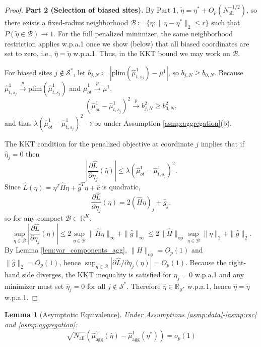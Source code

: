 \documentclass{article}
\newtheorem{lemma}[theorem]{Lemma}
\begin{document}
\begin{proof}
\textbf{Part 2 (Selection of biased sites).}
By Part 1, $\widetilde{\eta}=\eta^*+O_p(N_{\mathrm{all}}^{-1/2})$, so there exists a fixed-radius neighborhood
$\mathcal{B}\coloneqq\{\eta:\|\eta-\eta^*\|_2\le r\}$ such that $P(\widetilde{\eta}\in\mathcal{B})\to 1$.
For the full penalized minimizer, the same neighborhood restriction applies w.p.a.1 once we show (below) that all biased coordinates are set to zero, i.e., $\widehat{\eta}=\widetilde{\eta}$ w.p.a.1. Thus, in the KKT bound we may work on $\mathcal{B}$.

For biased sites $j \notin \mathcal{S}^*$, let $b_{j,N}\coloneqq |\text{plim}(\widehat{\mu}^1_{t,s_j}) - \mu^1|$, so $b_{j,N}\ge b_{0,N}$.
Because $\widehat{\mu}^1_{t,s_j}\xrightarrow{p}\text{plim}(\widehat{\mu}^1_{t,s_j})$ and $\widehat{\mu}^1_{ot}\xrightarrow{p}\mu^1$,
\[
(\widehat{\mu}^1_{ot} - \widehat{\mu}^1_{t,s_j})^2 \xrightarrow{p} b_{j,N}^2 \ge b_{0,N}^2,
\]
and thus $\lambda(\widehat{\mu}^1_{ot} - \widehat{\mu}^1_{t,s_j})^2\to\infty$ under Assumption \ref{asmp:aggregation}(b).

The KKT condition for the penalized objective at coordinate $j$ implies that if $\widehat{\eta}_j=0$ then
\[
\left| \frac{\partial \widehat{L}}{\partial \eta_j}(\widehat{\eta}) \right|
\le \lambda (\widehat{\mu}^1_{ot} - \widehat{\mu}^1_{t,s_j})^2.
\]
Since $\widehat{L}(\eta)=\eta^T\widehat{H}\eta+\widehat{g}^T\eta+\widehat{c}$ is quadratic,
\[
\frac{\partial \widehat{L}}{\partial \eta_j}(\eta)
=
2(\widehat{H}\eta)_j+\widehat{g}_j,
\]
so for any compact $\mathcal{B}\subset\mathbb{R}^K$,
\[
\sup_{\eta\in\mathcal{B}}\left|\frac{\partial \widehat{L}}{\partial \eta_j}(\eta)\right|
\le
2\sup_{\eta\in\mathcal{B}}\|\widehat{H}\eta\|_\infty+\|\widehat{g}\|_\infty
\le
2\|\widehat{H}\|_{\mathrm{op}}\sup_{\eta\in\mathcal{B}}\|\eta\|_2+\|\widehat{g}\|_2.
\]
By Lemma \ref{lem:var_components_agg}, $\|\widehat{H}\|_{\mathrm{op}}=O_p(1)$ and $\|\widehat{g}\|_2=O_p(1)$, hence $\sup_{\eta\in\mathcal{B}}|\partial \widehat{L}/\partial \eta_j(\eta)|=O_p(1)$.
Because the right-hand side diverges, the KKT inequality is satisfied for $\eta_j=0$ w.p.a.1 and any minimizer must set $\widehat{\eta}_j=0$ for all $j\notin\mathcal{S}^*$.
Therefore $\widehat{\eta}\in\mathbb{R}_{\mathcal{S}^*}$ w.p.a.1, hence $\widehat{\eta}=\widetilde{\eta}$ w.p.a.1.
\end{proof}

\begin{lemma}[Asymptotic Equivalence]\label{lem:asymp_equiv}
Under Assumptions \ref{asmp:data}-\ref{asmp:rsc} and \ref{asmp:aggregation}:
\[
\sqrt{N_{\mathrm{all}}}\left( \widehat{\mu}^1_{\text{agg}}(\widehat{\eta}) - \widehat{\mu}^1_{\text{agg}}(\eta^*) \right) = o_p(1)
\]
\end{lemma}
\end{document}
